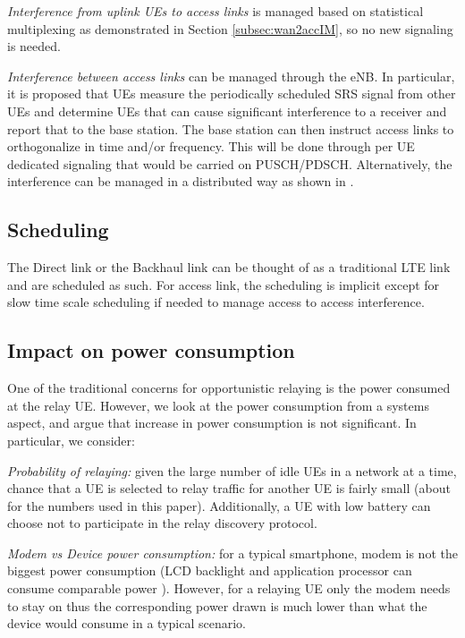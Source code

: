 \documentclass[journal]{IEEEtran}
\begin{document}
{\em Interference from uplink UEs to access links} is managed based on statistical multiplexing as demonstrated in Section \ref{subsec:wan2accIM}, so no new signaling is needed.

{\em Interference between access links} can be managed through the eNB. In particular, it is proposed that UEs measure the periodically scheduled SRS signal from other UEs and determine UEs that can cause significant interference to a receiver and report that to the base station. The base station can then instruct access links to orthogonalize in time and/or frequency. This will be done through per UE dedicated signaling that would be carried on PUSCH/PDSCH. Alternatively, the interference can be managed in a distributed way as shown in \cite{WuTavildarShakkottai10}.

\subsection{Scheduling}
The Direct link or the Backhaul link can be thought of as a traditional LTE link and are scheduled as such.  For access link, the scheduling is implicit except for slow time scale scheduling if needed to manage access to access interference.

\subsection{Impact on power consumption}

One of the traditional concerns for opportunistic relaying is the power consumed at the relay UE. However, we look at the power consumption from a systems aspect, and argue that increase in power consumption is not significant. In particular, we consider:


{\em Probability of relaying: } given the large number of idle UEs in a network at a time, chance that a UE is selected to relay traffic for another UE is fairly small (about  for the numbers used in this paper). Additionally, a UE with low battery can choose not to participate in the relay discovery protocol.

{\em Modem vs Device power consumption:} for a typical smartphone, modem is not the biggest power consumption (LCD backlight and application processor can consume comparable power \cite{CarrollHeiser10}). However, for a relaying UE only the modem needs to stay on thus the corresponding power drawn is much lower than what the device would consume in a typical scenario.
\end{document}
